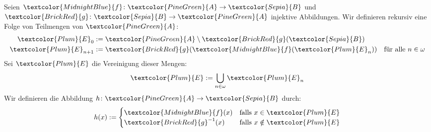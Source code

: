 \begin{math-stroke}
\begin{short-proof}
Seien $\textcolor{MidnightBlue}{f} \colon \textcolor{PineGreen}{A} \to \textcolor{Sepia}{B}$ und $\textcolor{BrickRed}{g} \colon \textcolor{Sepia}{B} \to \textcolor{PineGreen}{A}$ injektive Abbildungen.
Wir definieren rekursiv eine Folge von Teilmengen von $\textcolor{PineGreen}{A}$:
\begin{align*}
\textcolor{Plum}{E}_0 &:= \textcolor{PineGreen}{A} \setminus \textcolor{BrickRed}{g}(\textcolor{Sepia}{B}) \\
\textcolor{Plum}{E}_{n+1} &:= \textcolor{BrickRed}{g}(\textcolor{MidnightBlue}{f}(\textcolor{Plum}{E}_n)) \quad \text{für alle } n \in \omega
\end{align*}
Sei $\textcolor{Plum}{E}$ die Vereinigung dieser Mengen:
\[
\textcolor{Plum}{E} := \bigcup_{n \in \omega} \textcolor{Plum}{E}_n
\]
Wir definieren die Abbildung $h \colon \textcolor{PineGreen}{A} \to \textcolor{Sepia}{B}$ durch:
\[
h(x) := \begin{cases}
\textcolor{MidnightBlue}{f}(x) & \text{falls } x \in \textcolor{Plum}{E} \\
\textcolor{BrickRed}{g}^{-1}(x) & \text{falls } x \notin \textcolor{Plum}{E}
\end{cases}
\]

\begin{center}
\end{center}
\end{short-proof}
\end{math-stroke}
